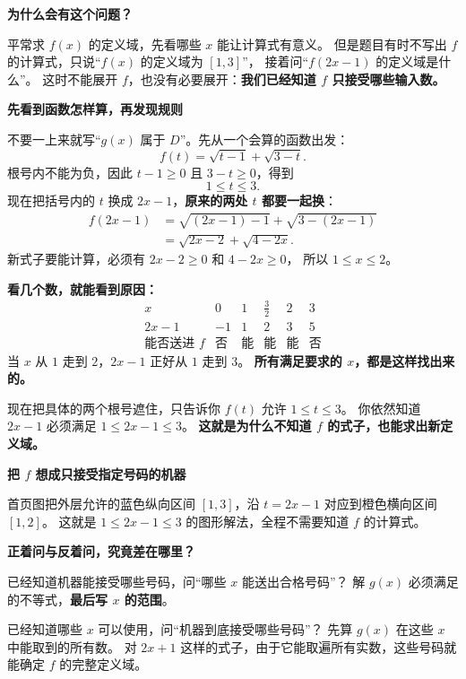 \clearpage
\begin{explanationbox}
\textbf{\textcolor{CExplanation}{为什么会有这个问题？}}

平常求 $f(x)$ 的定义域，先看哪些 $x$ 能让计算式有意义。
但是题目有时不写出 $f$ 的计算式，只说“$f(x)$ 的定义域为 $[1,3]$”，
接着问“$f(2x-1)$ 的定义域是什么”。
这时不能展开 $f$，也没有必要展开：\textbf{我们已经知道 $f$ 只接受哪些输入数。}

\medskip
\textbf{\textcolor{CExplanation}{先看到函数怎样算，再发现规则}}

不要一上来就写“$g(x)$ 属于 $D$”。先从一个会算的函数出发：
\[
 f(t)=\sqrt{t-1}+\sqrt{3-t}.
\]
根号内不能为负，因此 $t-1\ge0$ 且 $3-t\ge0$，得到
\[
 \boxed{1\le t\le3}.
\]
现在把括号内的 $t$ 换成 $2x-1$，\textbf{原来的两处 $t$ 都要一起换}：
\[
\begin{aligned}
 f(2x-1)
 &=\sqrt{(2x-1)-1}+\sqrt{3-(2x-1)}\\
 &=\sqrt{2x-2}+\sqrt{4-2x}.
\end{aligned}
\]
新式子要能计算，必须有 $2x-2\ge0$ 和 $4-2x\ge0$，
所以 $1\le x\le2$。

\textbf{看几个数，就能看到原因：}
\[
\begin{array}{c|ccccc}
 x&0&1&\frac32&2&3\\ \hline
 2x-1&-1&1&2&3&5\\
 \text{能否送进 }f&\text{否}&\text{能}&\text{能}&\text{能}&\text{否}
\end{array}
\]
当 $x$ 从 $1$ 走到 $2$，$2x-1$ 正好从 $1$ 走到 $3$。
\textbf{所有满足要求的 $x$，都是这样找出来的。}

现在把具体的两个根号遮住，只告诉你 $f(t)$ 允许 $1\le t\le3$。
你依然知道 $2x-1$ 必须满足 $1\le2x-1\le3$。
\textbf{这就是为什么不知道 $f$ 的式子，也能求出新定义域。}

\medskip

\textbf{\textcolor{CExplanation}{把 $f$ 想成只接受指定号码的机器}}

首页图把外层允许的蓝色纵向区间 $[1,3]$，沿 $t=2x-1$ 对应到橙色横向区间 $[1,2]$。
这就是 $1\le2x-1\le3$ 的图形解法，全程不需要知道 $f$ 的计算式。

\medskip
\textbf{\textcolor{CExplanation}{正着问与反着问，究竟差在哪里？}}
\begin{description}[style=nextline,leftmargin=2.8em,labelsep=0.5em,itemsep=0.45em]
 \item[\textbf{正着问：}] 已经知道机器能接受哪些号码，问“哪些 $x$ 能送出合格号码”？
 解 $g(x)$ 必须满足的不等式，\textbf{最后写 $x$ 的范围}。
 \item[\textbf{反着问：}] 已经知道哪些 $x$ 可以使用，问“机器到底接受哪些号码”？
 先算 $g(x)$ 在这些 $x$ 中能取到的所有数。
 对 $2x+1$ 这样的式子，由于它能取遍所有实数，这些号码就能确定 $f$ 的完整定义域。
\end{description}


\end{explanationbox}
